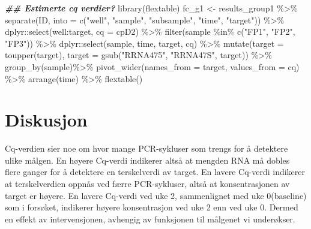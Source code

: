 \documentclass[
]{book}
\newenvironment{Shaded}{\begin{snugshade}}{\end{snugshade}}
\newcommand{\AttributeTok}[1]{\textcolor[rgb]{0.77,0.63,0.00}{#1}}
\newcommand{\DocumentationTok}[1]{\textcolor[rgb]{0.56,0.35,0.01}{\textbf{\textit{#1}}}}
\newcommand{\FunctionTok}[1]{\textcolor[rgb]{0.00,0.00,0.00}{#1}}
\newcommand{\NormalTok}[1]{#1}
\newcommand{\OtherTok}[1]{\textcolor[rgb]{0.56,0.35,0.01}{#1}}
\newcommand{\SpecialCharTok}[1]{\textcolor[rgb]{0.00,0.00,0.00}{#1}}
\newcommand{\StringTok}[1]{\textcolor[rgb]{0.31,0.60,0.02}{#1}}
\begin{document}
\begin{Shaded}
\begin{Highlighting}[]
\DocumentationTok{\#\# Estimerte cq verdier? }
\FunctionTok{library}\NormalTok{(flextable)}
\NormalTok{fc\_g1 }\OtherTok{\textless{}{-}}\NormalTok{ results\_group1 }\SpecialCharTok{\%\textgreater{}\%}
  \FunctionTok{separate}\NormalTok{(ID, }\AttributeTok{into =} \FunctionTok{c}\NormalTok{(}\StringTok{"well"}\NormalTok{, }\StringTok{"sample"}\NormalTok{, }\StringTok{"subsample"}\NormalTok{, }\StringTok{"time"}\NormalTok{, }\StringTok{"target"}\NormalTok{)) }\SpecialCharTok{\%\textgreater{}\%}
\NormalTok{  dplyr}\SpecialCharTok{::}\FunctionTok{select}\NormalTok{(well}\SpecialCharTok{:}\NormalTok{target, }\AttributeTok{cq =}\NormalTok{ cpD2) }\SpecialCharTok{\%\textgreater{}\%}
  \FunctionTok{filter}\NormalTok{(sample }\SpecialCharTok{\%in\%} \FunctionTok{c}\NormalTok{(}\StringTok{"FP1"}\NormalTok{, }\StringTok{"FP2"}\NormalTok{, }\StringTok{"FP3"}\NormalTok{)) }\SpecialCharTok{\%\textgreater{}\%}
\NormalTok{  dplyr}\SpecialCharTok{::}\FunctionTok{select}\NormalTok{(sample, time, target, cq) }\SpecialCharTok{\%\textgreater{}\%}
  \FunctionTok{mutate}\NormalTok{(}\AttributeTok{target =} \FunctionTok{toupper}\NormalTok{(target), }
         \AttributeTok{target =} \FunctionTok{gsub}\NormalTok{(}\StringTok{"RRNA475"}\NormalTok{, }\StringTok{"RRNA47S"}\NormalTok{, target)) }\SpecialCharTok{\%\textgreater{}\%}
  \FunctionTok{group\_by}\NormalTok{(sample)}\SpecialCharTok{\%\textgreater{}\%}
  \FunctionTok{pivot\_wider}\NormalTok{(}\AttributeTok{names\_from =}\NormalTok{ target, }\AttributeTok{values\_from =}\NormalTok{ cq) }\SpecialCharTok{\%\textgreater{}\%}
  \FunctionTok{arrange}\NormalTok{(time) }\SpecialCharTok{\%\textgreater{}\%}
   \FunctionTok{flextable}\NormalTok{()}
\end{Highlighting}
\end{Shaded}

\hypertarget{diskusjon-1}{%
\section{Diskusjon}\label{diskusjon-1}}

Cq-verdien sier noe om hvor mange PCR-sykluser som trengs for å detektere ulike målgen\citep{kuang2018}. En høyere Cq-verdi indikerer altså at mengden RNA må dobles flere ganger for å detektere en terskelverdi av target. En lavere Cq-verdi indikerer at terskelverdien oppnås ved færre PCR-sykluser, altså at konsentrasjonen av target er høyere. En lavere Cq-verdi ved uke 2, sammenlignet med uke 0(baseline) som i forsøket, indikerer høyere konsentrasjon ved uke 2 enn ved uke 0. Dermed en effekt av intervensjonen, avhengig av funksjonen til målgenet vi underøkser.
\end{document}
